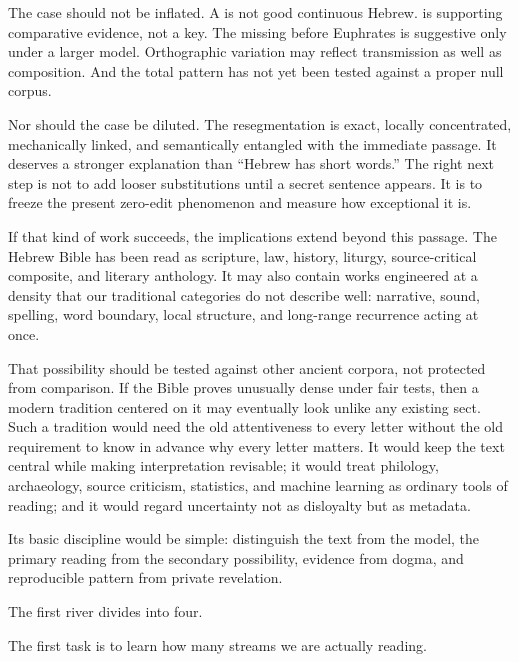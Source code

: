 The case should not be inflated. A is not good continuous Hebrew.  is supporting comparative evidence, not a key. The missing  before Euphrates is suggestive only under a larger model. Orthographic variation may reflect transmission as well as composition. And the total pattern has not yet been tested against a proper null corpus.

Nor should the case be diluted. The resegmentation is exact, locally concentrated, mechanically linked, and semantically entangled with the immediate passage. It deserves a stronger explanation than ``Hebrew has short words.'' The right next step is not to add looser substitutions until a secret sentence appears. It is to freeze the present zero-edit phenomenon and measure how exceptional it is.

If that kind of work succeeds, the implications extend beyond this passage. The Hebrew Bible has been read as scripture, law, history, liturgy, source-critical composite, and literary anthology. It may also contain works engineered at a density that our traditional categories do not describe well: narrative, sound, spelling, word boundary, local structure, and long-range recurrence acting at once.

That possibility should be tested against other ancient corpora, not protected from comparison. If the Bible proves unusually dense under fair tests, then a modern tradition centered on it may eventually look unlike any existing sect. Such a tradition would need the old attentiveness to every letter without the old requirement to know in advance why every letter matters. It would keep the text central while making interpretation revisable; it would treat philology, archaeology, source criticism, statistics, and machine learning as ordinary tools of reading; and it would regard uncertainty not as disloyalty but as metadata.

Its basic discipline would be simple: distinguish the text from the model, the primary reading from the secondary possibility, evidence from dogma, and reproducible pattern from private revelation.

The first river divides into four.

The first task is to learn how many streams we are actually reading.


